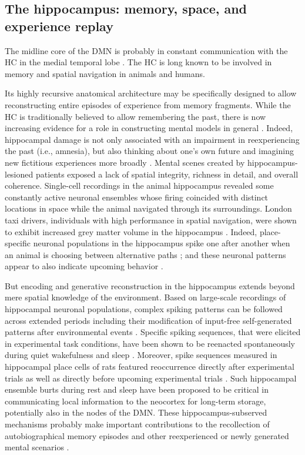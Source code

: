 \documentclass[10pt,letterpaper]{article}
\begin{document}
\subsection{The hippocampus: memory, space, and experience replay}
The midline core of the DMN is probably in constant communication
with the HC in the medial temporal lobe \citep{vincet2006}.
The HC is long known to be involved in memory and spatial navigation in animals and humans.



Its highly recursive anatomical architecture
may be specifically designed to allow reconstructing
entire episodes of experience from memory fragments.
%
While the HC
is traditionally believed to allow remembering the past,
there is now increasing evidence for a role
in constructing mental models in general
\citep{maguire2016, schacter2007remembering, gelbard2008internally, Javadi2017}.
Indeed,
hippocampal damage is
not only associated with an impairment in reexperiencing the past (i.e., amnesia),
but also thinking about one's own future and
imagining new fictitious experiences more broadly \citep{hassabis2007patients}.
Mental scenes created by hippocampus-lesioned patients exposed a lack of
spatial integrity, richness in detail, and overall coherence.
%
Single-cell recordings in the animal hippocampus revealed
some constantly active neuronal ensembles whose firing coincided with
distinct locations in space while the animal navigated through its surroundings.
London taxi drivers, individuals with high performance in spatial navigation,
were shown to exhibit increased grey matter volume in the
hippocampus \citep{maguire2000navigation}.
Indeed, place-specific neuronal populations in the hippocampus
spike one after another when an animal is choosing between alternative
paths \citep{johnson2007neural}; and
these neuronal patterns appear to also indicate upcoming behavior
\citep{pfeiffer2013hippocampal}.


But encoding and generative reconstruction in the hippocampus extends
beyond mere spatial knowledge of the environment.
Based on large-scale recordings of hippocampal neuronal populations,
complex spiking patterns can be followed across extended periods including
their modification of input-free self-generated patterns
after environmental events \citep{buzsaki2004large}.
Specific spiking sequences, that were elicited in experimental task conditions,
have been shown to be reenacted spontaneously during
quiet wakefulness and sleep \citep{hartley2014space, o2010play}.
Moreover, spike sequences measured in hippocampal place cells of rats
featured reoccurrence directly after experimental trials
as well as directly before upcoming experimental trials \citep{diba2007forward}.
Such hippocampal ensemble burts during rest and sleep
have been proposed to be critical in communicating local information
to the neocortex for long-term storage, potentially also in the nodes of the DMN.
These hippocampus-subserved mechanisms
probably make important contributions to the
recollection of autobiographical memory episodes and other
reexperienced or newly generated mental scenarios
\citep{hassabis2007patients}.
\end{document}
